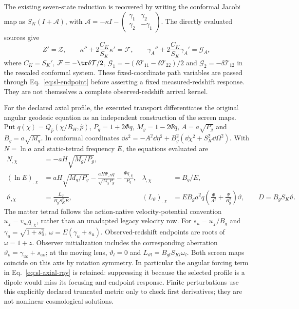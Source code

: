 The existing seven-state reduction is recovered by writing the conformal
Jacobi map as $S_K(I+\mathcal A)$, with
$\mathcal A=-\kappa I-\left(\begin{smallmatrix}
\gamma_1&\gamma_2\\\gamma_2&-\gamma_1\end{smallmatrix}\right)$.
The directly evaluated sources give
\begin{equation}
 Z'=\mathcal Z,\qquad
 \kappa''+2\frac{C_K}{S_K}\kappa'=\mathcal F,\qquad
 \gamma_A''+2\frac{C_K}{S_K}\gamma_A'=\mathcal G_A,
 \label{eq:sl-seven}
\end{equation}
where $C_K=S_K'$, $\mathcal F=-\tr\delta\mathcal T/2$,
$\mathcal G_1=-(\delta\mathcal T_{11}-\delta\mathcal T_{22})/2$ and
$\mathcal G_2=-\delta\mathcal T_{12}$ in the rescaled conformal system.
These fixed-coordinate path variables are passed through
Eq.~\eqref{eq:sl-endpoint} before asserting a fixed measured-redshift
response. They are not themselves a complete observed-redshift arrival
kernel.

For the declared axial profile, the executed transport differentiates the
original angular geodesic equation as an independent construction of the
screen maps. Put $q(\chi)=Q_{\hat p}(\chi/R_H,\hat p)$,
$P_g=1+2\Phi q$, $M_g=1-2\Psi q$, $A=a\sqrt{P_g}$ and
$B_g=a\sqrt{M_g}$. In conformal coordinates
$\dd s^2=-A^2\dd\eta^2+B_g^2(\dd\chi^2+S_K^2\dd\Omega^2)$.
With $N=\ln a$ and static-tetrad frequency $E$, the equations evaluated are
\begin{align}
 N_{,\chi}&=-aH\sqrt{M_g/P_g},\nonumber\\
 (\ln E)_{,\chi}&=aH\sqrt{M_g/P_g}
 -\frac{aH\Psi_{,N}q}{\sqrt{M_gP_g}}
 -\frac{\Phi q_{,\chi}}{P_g},
 &\lambda_{,\chi}&=B_g/E,\label{eq:sl-axial-ray}\\
 \vartheta_{,\chi}&=\frac{L_\vartheta}{B_gS_K^2E},
 & (L_\vartheta)_{,\chi}&=EB_g a^2q
 \left(\frac{\Phi}{A^2}+\frac{\Psi}{B_g^2}\right)\vartheta,
 \qquad D=B_gS_K\vartheta.\nonumber
\end{align}
The matter tetrad follows the action-native velocity-potential convention
$u_\chi=v_m q_{,\chi}$, rather than an unadapted legacy velocity row.
For $s_u=u_\chi/B_g$ and $\gamma_u=\sqrt{1+s_u^2}$,
$\omega=E(\gamma_u+s_u)$. Observed-redshift endpoints are roots of
$\omega=1+z$. Observer initialization includes the corresponding aberration
$\vartheta_o=\gamma_{uo}+s_{uo}$; at the moving lens,
$\vartheta_l=0$ and $L_{\vartheta l}=B_{gl}S_{Kl}\omega_l$.
Both screen maps coincide on this axis by rotation symmetry.
In particular the angular forcing term in
Eq.~\eqref{eq:sl-axial-ray} is retained: suppressing it because the selected
profile is a dipole would miss its focusing and endpoint response.
Finite perturbations use this explicitly declared truncated metric only
to check first derivatives; they are not nonlinear cosmological solutions.

